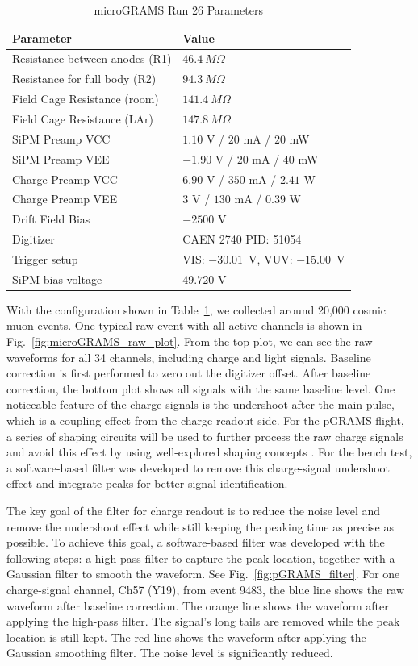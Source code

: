 \begin{table}
\centering
\begin{tabular}{l l}
\hline
\textbf{Parameter} & \textbf{Value} \\
\hline
Resistance between anodes (R1) & $46.4~M\Omega$ \\
Resistance for full body (R2) & $94.3~M\Omega$ \\
Field Cage Resistance (room) & $141.4~M\Omega$ \\
Field Cage Resistance (LAr) & $147.8~M\Omega$ \\
SiPM Preamp VCC & $1.10$ V / $20$ mA / $20$ mW \\
SiPM Preamp VEE & $-1.90$ V / $20$ mA / $40$ mW \\
Charge Preamp VCC & $6.90$ V / $350$ mA / $2.41$ W \\
Charge Preamp VEE & $3$ V / $130$ mA / $0.39$ W \\
Drift Field Bias & $-2500$ V \\
Digitizer & CAEN 2740 PID: 51054 \\
Trigger setup & VIS: $-30.01$~V, VUV: $-15.00$~V \\
SiPM bias voltage & $49.720$ V \\
\hline
\end{tabular}
\caption{microGRAMS Run 26 Parameters}
\label{tab:run26_parameters}
\end{table}

With the configuration shown in Table~\ref{tab:run26_parameters}, we collected around 20,000 cosmic muon events. One typical raw event with all active channels is shown in Fig.~\ref{fig:microGRAMS_raw_plot}. From the top plot, we can see the raw waveforms for all 34 channels, including charge and light signals. Baseline correction is first performed to zero out the digitizer offset. After baseline correction, the bottom plot shows all signals with the same baseline level. One noticeable feature of the charge signals is the undershoot after the main pulse, which is a coupling effect from the charge-readout side. For the pGRAMS flight, a series of shaping circuits will be used to further process the raw charge signals and avoid this effect by using well-explored shaping concepts \cite{OHKAWA197685}. For the bench test, a software-based filter was developed to remove this charge-signal undershoot effect and integrate peaks for better signal identification.

The key goal of the filter for charge readout is to reduce the noise level and remove the undershoot effect while still keeping the peaking time as precise as possible. To achieve this goal, a software-based filter was developed with the following steps: a high-pass filter to capture the peak location, together with a Gaussian filter to smooth the waveform. See Fig.~\ref{fig:pGRAMS_filter}. For one charge-signal channel, Ch57 (Y19), from event 9483, the blue line shows the raw waveform after baseline correction. The orange line shows the waveform after applying the high-pass filter. The signal's long tails are removed while the peak location is still kept. The red line shows the waveform after applying the Gaussian smoothing filter. The noise level is significantly reduced.

